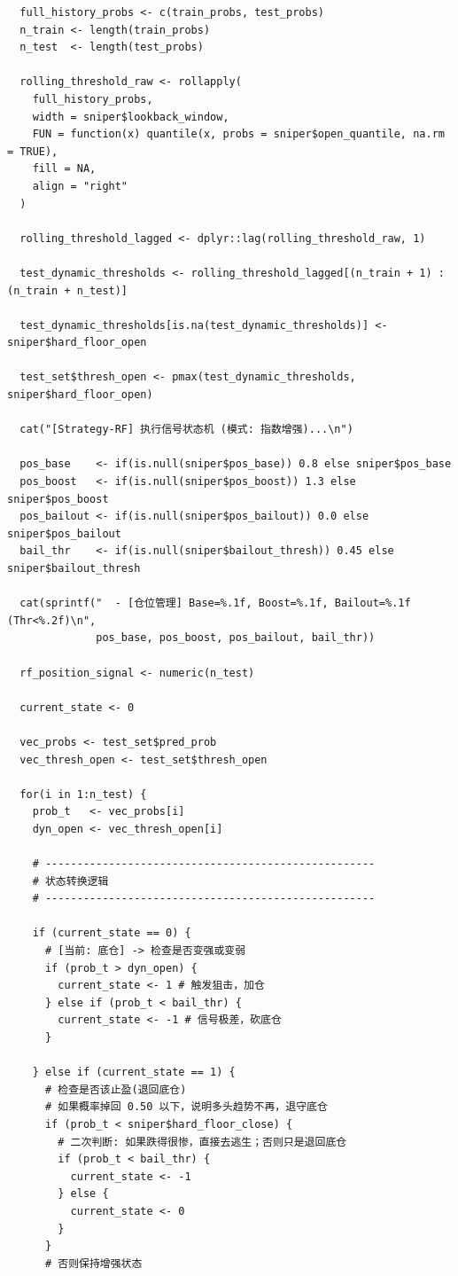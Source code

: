 \documentclass[11pt, a4paper]{article}
\begin{document}
\begin{verbatim}
  full_history_probs <- c(train_probs, test_probs)
  n_train <- length(train_probs)
  n_test  <- length(test_probs)
  
  rolling_threshold_raw <- rollapply(
    full_history_probs, 
    width = sniper$lookback_window, 
    FUN = function(x) quantile(x, probs = sniper$open_quantile, na.rm = TRUE),
    fill = NA, 
    align = "right"
  )
  
  rolling_threshold_lagged <- dplyr::lag(rolling_threshold_raw, 1)

  test_dynamic_thresholds <- rolling_threshold_lagged[(n_train + 1) : (n_train + n_test)]
  
  test_dynamic_thresholds[is.na(test_dynamic_thresholds)] <- sniper$hard_floor_open

  test_set$thresh_open <- pmax(test_dynamic_thresholds, sniper$hard_floor_open)
  
  cat("[Strategy-RF] 执行信号状态机 (模式: 指数增强)...\n")

  pos_base    <- if(is.null(sniper$pos_base)) 0.8 else sniper$pos_base
  pos_boost   <- if(is.null(sniper$pos_boost)) 1.3 else sniper$pos_boost
  pos_bailout <- if(is.null(sniper$pos_bailout)) 0.0 else sniper$pos_bailout
  bail_thr    <- if(is.null(sniper$bailout_thresh)) 0.45 else sniper$bailout_thresh
  
  cat(sprintf("  - [仓位管理] Base=%.1f, Boost=%.1f, Bailout=%.1f (Thr<%.2f)\n", 
              pos_base, pos_boost, pos_bailout, bail_thr))

  rf_position_signal <- numeric(n_test)

  current_state <- 0 
  
  vec_probs <- test_set$pred_prob
  vec_thresh_open <- test_set$thresh_open
  
  for(i in 1:n_test) {
    prob_t   <- vec_probs[i]
    dyn_open <- vec_thresh_open[i]
    
    # ----------------------------------------------------
    # 状态转换逻辑
    # ----------------------------------------------------
    
    if (current_state == 0) {
      # [当前: 底仓] -> 检查是否变强或变弱
      if (prob_t > dyn_open) {
        current_state <- 1 # 触发狙击，加仓
      } else if (prob_t < bail_thr) {
        current_state <- -1 # 信号极差，砍底仓
      }
      
    } else if (current_state == 1) {
      # 检查是否该止盈(退回底仓)
      # 如果概率掉回 0.50 以下，说明多头趋势不再，退守底仓
      if (prob_t < sniper$hard_floor_close) {
        # 二次判断: 如果跌得很惨，直接去逃生；否则只是退回底仓
        if (prob_t < bail_thr) {
          current_state <- -1
        } else {
          current_state <- 0
        }
      }
      # 否则保持增强状态
      

\end{verbatim}
\end{document}
